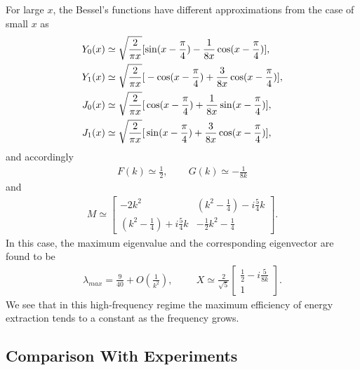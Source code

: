 For large $x$, the Bessel's functions have different approximations from the case of small $x$ as
\begin{align}
Y_0(x) & \simeq  \sqrt{\frac{2}{\pi x}} [ \sin (x-\frac{\pi}{4}) - \frac{1}{8x} \cos (x - \frac{\pi}{4}) ], \\
Y_1(x) & \simeq  \sqrt{\frac{2}{\pi x}} \large{[} -\cos (x-\frac{\pi}{4})+\frac{3}{8x} \cos (x - \frac{\pi}{4}) \large{]}, \\
J_0(x) & \simeq  \sqrt{\frac{2}{\pi x}} \large{[} \cos (x-\frac{\pi}{4}) + \frac{1}{8x} \sin (x - \frac{\pi}{4}) \large{]}, \\
J_1(x) & \simeq  \sqrt{\frac{2}{\pi x}} \large{[} \sin (x-\frac{\pi}{4}) + \frac{3}{8x} \cos (x - \frac{\pi}{4}) \large{]},
\end{align}
and accordingly
\begin{align}
F(k) \simeq \frac{1}{2},   \hspace{25pt}  G(k) \simeq -\frac{1}{8k}
\end{align}
and
\begin{align}
M \simeq \begin{bmatrix}   -2k^2   &  (k^2 - \frac{1}{4}) - i\frac{5}{4}k  \\
                        (k^2 - \frac{1}{4}) + i\frac{5}{4}k &   -\frac{1}{2}k^2 - \frac{1}{4}  \end{bmatrix}.
\end{align}
In this case, the maximum eigenvalue and the corresponding eigenvector are found to be
\begin{align}
\lambda_{max} = \frac{9}{40} + O(\frac{1}{k^2}), \hspace{1cm}
X \simeq \frac{2}{\sqrt{5}}
\begin{bmatrix} \frac{1}{2} - i \frac{5}{8k}   \\     1     \end{bmatrix}.
\end{align}
We see that in this high-frequency regime the maximum efficiency of energy extraction tends to a constant as the frequency grows.

\subsection{Comparison With Experiments}

